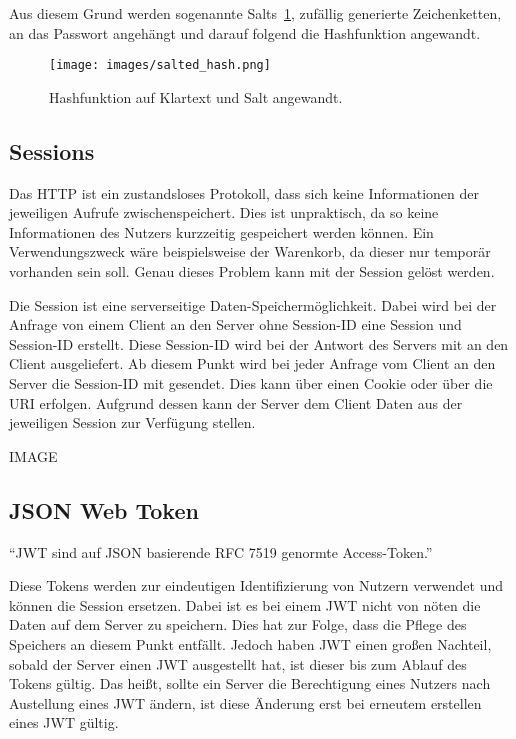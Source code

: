 \documentclass[11pt]{article}
\begin{document}
	Aus diesem Grund werden sogenannte Salts~\ref{fig:salted-hash}, zufällig generierte Zeichenketten, an das Passwort angehängt und darauf folgend die Hashfunktion angewandt.

	\begin{figure}[h]
		\texttt{[image: images/salted\_hash.png]}
		\caption{Hashfunktion auf Klartext und Salt angewandt.}
		\label{fig:salted-hash}
	\end{figure}
		
	\subsection{Sessions}
	\label{sec: sessions}
	
	Das \gls{HTTP} ist ein zustandsloses Protokoll, dass sich keine Informationen der jeweiligen Aufrufe zwischenspeichert. Dies ist unpraktisch, da so keine Informationen des Nutzers kurzzeitig gespeichert werden können. Ein Verwendungszweck wäre beispielsweise der Warenkorb, da dieser nur temporär vorhanden sein soll. Genau dieses Problem kann mit der Session gelöst werden.
	
	Die Session ist eine serverseitige Daten-Speichermöglichkeit. Dabei wird bei der Anfrage von einem Client an den Server ohne Session-ID eine Session und Session-ID erstellt. Diese Session-ID wird bei der Antwort des Servers mit an den Client ausgeliefert. Ab diesem Punkt wird bei jeder Anfrage vom Client an den Server die Session-ID mit gesendet. Dies kann über einen Cookie oder über die \gls{URI} erfolgen. Aufgrund dessen kann der Server dem Client Daten aus der jeweiligen Session zur Verfügung stellen.
	
	IMAGE
	
	\newpage
	
	\subsection{JSON Web Token}
	\label{sec: jwt}
	\enquote{\gls{JWT} sind auf \gls{JSON} basierende \gls{RFC} 7519 genormte Access-Token.}
	
	Diese Tokens werden zur eindeutigen Identifizierung von Nutzern verwendet und können die Session ersetzen. Dabei ist es bei einem \gls{JWT} nicht von nöten die Daten auf dem Server zu speichern. Dies hat zur Folge, dass die Pflege des Speichers an diesem Punkt entfällt. Jedoch haben \gls{JWT} einen großen Nachteil, sobald der Server einen \gls{JWT} ausgestellt hat, ist dieser bis zum Ablauf des Tokens gültig. Das heißt, sollte ein Server die Berechtigung eines Nutzers nach Austellung eines \gls{JWT} ändern, ist diese Änderung erst bei erneutem erstellen eines \gls{JWT} gültig.
	
\end{document}
